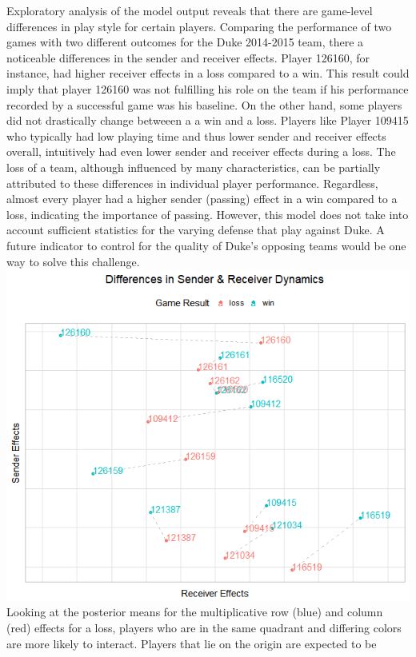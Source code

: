 \documentclass[12pt,twoside]{dukestatscithesis}
\theoremstyle{definition}
\theoremstyle{definition}
\theoremstyle{definition}
\theoremstyle{remark}
\begin{document}
Exploratory analysis of the model output reveals that there are
game-level differences in play style for certain players. Comparing the
performance of two games with two different outcomes for the Duke
2014-2015 team, there a noticeable differences in the sender and
receiver effects. Player 126160, for instance, had higher receiver
effects in a loss compared to a win. This result could imply that player
126160 was not fulfilling his role on the team if his performance
recorded by a successful game was his baseline. On the other hand, some
players did not drastically change betweeen a a win and a loss. Players
like Player 109415 who typically had low playing time and thus lower
sender and receiver effects overall, intuitively had even lower sender
and receiver effects during a loss. The loss of a team, although
influenced by many characteristics, can be partially attributed to these
differences in individual player performance. Regardless, almost every
player had a higher sender (passing) effect in a win compared to a loss,
indicating the importance of passing. However, this model does not take
into account sufficient statistics for the varying defense that play
against Duke. A future indicator to control for the quality of Duke's
opposing teams would be one way to solve this challenge.\\
\includegraphics{img/sendreceiver.png} Looking at the posterior means
for the multiplicative row (blue) and column (red) effects for a loss,
players who are in the same quadrant and differing colors are more
likely to interact. Players that lie on the origin are expected to be
\end{document}
